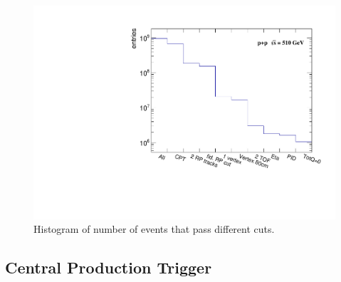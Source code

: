 \FloatBarrier
\begin{figure}[ht]
    \centering
    \includegraphics[width=1\textwidth]{figures/AnalysisFlow.pdf}
    \caption[Event selection for production of $K^0_S$ and $\lambda^0$]{Histogram of number of events that pass different cuts.}
    \label{af1}
\end{figure}
\FloatBarrier

\subsection{Central Production Trigger}

